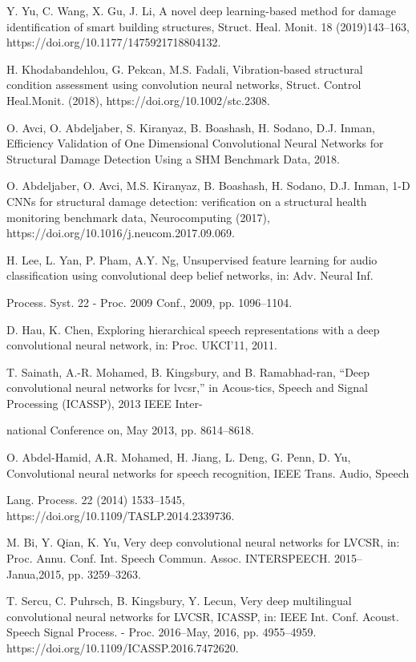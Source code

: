 \documentclass[15pt]{article}
\begin{document}
\begin{thebibliography}{99}
 Y. Yu, C. Wang, X. Gu, J. Li, A novel deep learning-based method for damage identification of smart building structures, Struct. Heal. Monit. 18 (2019)143–163, https://doi.org/10.1177/1475921718804132.

 H. Khodabandehlou, G. Pekcan, M.S. Fadali, Vibration-based structural condition assessment using convolution neural networks, Struct. Control Heal.Monit. (2018), https://doi.org/10.1002/stc.2308.

 O. Avci, O. Abdeljaber, S. Kiranyaz, B. Boashash, H. Sodano, D.J. Inman, Efficiency Validation of One Dimensional Convolutional Neural Networks for Structural Damage Detection Using a SHM Benchmark Data, 2018.

 O. Abdeljaber, O. Avci, M.S. Kiranyaz, B. Boashash, H. Sodano, D.J. Inman, 1-D CNNs for structural damage detection: verification on a structural health monitoring benchmark data, Neurocomputing (2017), https://doi.org/10.1016/j.neucom.2017.09.069.

 H. Lee, L. Yan, P. Pham, A.Y. Ng, Unsupervised feature learning for audio classification using convolutional deep belief networks, in: Adv. Neural Inf.

Process. Syst. 22 - Proc. 2009 Conf., 2009, pp. 1096–1104.

 D. Hau, K. Chen, Exploring hierarchical speech representations with a deep convolutional neural network, in: Proc. UKCI’11, 2011.

 T. Sainath, A.-R. Mohamed, B. Kingsbury, and B. Ramabhad-ran, “Deep convolutional neural networks for lvcsr,” in Acous-tics, Speech and Signal Processing (ICASSP), 2013 IEEE Inter-

national Conference on, May 2013, pp. 8614–8618.

 O. Abdel-Hamid, A.R. Mohamed, H. Jiang, L. Deng, G. Penn, D. Yu, Convolutional neural networks for speech recognition, IEEE Trans. Audio, Speech

Lang. Process. 22 (2014) 1533–1545, https://doi.org/10.1109/TASLP.2014.2339736.

 M. Bi, Y. Qian, K. Yu, Very deep convolutional neural networks for LVCSR, in: Proc. Annu. Conf. Int. Speech Commun. Assoc. INTERSPEECH. 2015–Janua,2015, pp. 3259–3263.

 T. Sercu, C. Puhrsch, B. Kingsbury, Y. Lecun, Very deep multilingual convolutional neural networks for LVCSR, ICASSP, in: IEEE Int. Conf. Acoust. Speech Signal Process. - Proc. 2016–May, 2016, pp. 4955–4959. https://doi.org/10.1109/ICASSP.2016.7472620.


\end{thebibliography}
\end{document}
